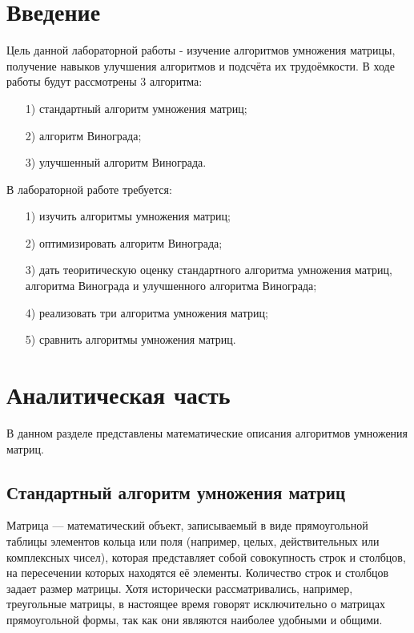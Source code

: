 \documentclass[12pt]{report}
\begin{document}
	\chapter*{Введение}
	Цель данной лабораторной работы - изучение алгоритмов умножения матрицы, получение навыков улучшения алгоритмов и подсчёта их трудоёмкости. В ходе работы будут рассмотрены 3 алгоритма:
	\begin{enumerate}
		\item[1)] стандартный алгоритм умножения матриц;
		\item[2)] алгоритм Винограда;
		\item[3)] улучшенный алгоритм Винограда.
	\end{enumerate}
	В лабораторной работе требуется:
	\begin{enumerate}
		\item[1)] изучить алгоритмы умножения матриц;
		\item[2)] оптимизировать алгоритм Винограда;
		\item[3)] дать теоритическую оценку стандартного алгоритма умножения матриц, алгоритма Винограда и улучшенного алгоритма Винограда;
		\item[4)] реализовать три алгоритма умножения матриц;
		\item[5)] сравнить алгоритмы умножения матриц.		
	\end{enumerate}
	
	
	\newpage
	\chapter{Аналитическая часть}
	В данном разделе представлены математические описания алгоритмов умножения матриц.
	
	\section{Стандартный алгоритм умножения матриц}
	
	Матрица — математический объект, записываемый в виде прямоугольной таблицы элементов кольца или поля (например, целых, действительных или комплексных чисел), которая представляет собой совокупность строк и столбцов, на пересечении которых находятся её элементы. Количество строк и столбцов задает размер матрицы. Хотя исторически рассматривались, например, треугольные матрицы, в настоящее время говорят исключительно о матрицах прямоугольной формы, так как они являются наиболее удобными и общими. 
	
\end{document}

